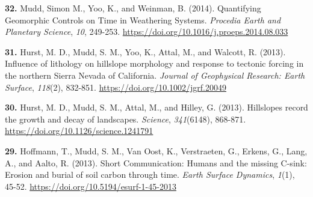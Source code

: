 \documentclass[10pt, a4paper]{article}
\newcommand{\years}[1]{\marginnote{\scriptsize #1}}
\begin{document}
\years{2014}\hangindent=0.7cm\textbf{32. }Mudd, Simon M., Yoo, K., and Weinman, B. (2014). Quantifying Geomorphic Controls on Time in Weathering Systems. \textit{Procedia Earth and Planetary Science}, \textit{10}, 249-253. \href{https://doi.org/10.1016/j.proeps.2014.08.033}{https://doi.org/10.1016/j.proeps.2014.08.033}\par
\years{2013}\hangindent=0.7cm\textbf{31. }Hurst, M. D., Mudd, S. M., Yoo, K., Attal, M., and Walcott, R. (2013). Influence of lithology on hillslope morphology and response to tectonic forcing in the northern Sierra Nevada of California. \textit{Journal of Geophysical Research: Earth Surface}, \textit{118}(2), 832-851. \href{https://doi.org/10.1002/jgrf.20049}{https://doi.org/10.1002/jgrf.20049}\par


\years{2013}\hangindent=0.7cm\textbf{30. }Hurst, M. D., Mudd, S. M., Attal, M., and Hilley, G. (2013). Hillslopes record the growth and decay of landscapes. \textit{Science}, \textit{341}(6148), 868-871. \href{https://doi.org/10.1126/science.1241791}{https://doi.org/10.1126/science.1241791}\par
\years{2013}\hangindent=0.7cm\textbf{29. }Hoffmann, T., Mudd, S. M., Van Oost, K., Verstraeten, G., Erkens, G., Lang, A., and Aalto, R. (2013). Short Communication: Humans and the missing C-sink: Erosion and burial of soil carbon through time. \textit{Earth Surface Dynamics}, \textit{1}(1), 45-52. \href{https://doi.org/10.5194/esurf-1-45-2013}{https://doi.org/10.5194/esurf-1-45-2013}\par
\end{document}
